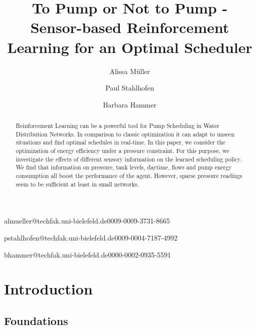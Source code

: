 \documentclass[english]{lni}
\begin{document}
\title[To Pump or Not to Pump]{To Pump or Not to Pump - Sensor-based Reinforcement
Learning for an Optimal Scheduler}
\author[1]{Alissa Müller}{almueller@techfak.uni-bielefeld.de}{0009-0009-3731-8665}
\author[1]{Paul Stahlhofen}{pstahlhofen@techfak.uni-bielefeld.de}{0009-0004-7187-4992}
\author[1]{Barbara Hammer}{bhammer@techfak.uni-bielefeld.de}{0000-0002-0935-5591
}
\maketitle

\begin{abstract}
Reinforcement Learning can be a powerful tool for Pump Scheduling in Water
Distribution Networks. In comparison to classic optimization it can adapt to
unseen situations and find optimal schedules in real-time.
In this paper, we consider the optimization of energy efficiency under a
pressure constraint. For this purpose, we investigate the effects of different sensory information on the learned scheduling policy.
We find that information on pressure, tank levels, daytime, flows and pump energy consumption all boost the performance of the agent.
However, sparse pressure readings seem to be sufficient at least in small networks.
\end{abstract}
\section{Introduction}
\label{sec:Introduction}

\subsection{Foundations}
\label{sec:foundations}
%

\end{document}
